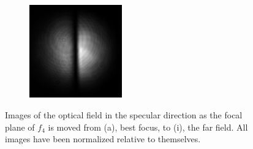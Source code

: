 \begin{figure}[ht]
  \begin{subfigure}[b]{4cm}
    \includegraphics[width=4cm,keepaspectratio]{interference/figures/move/123-1.png}
    \caption{}
  \end{subfigure}
  \caption{Images of the optical field in the specular direction as the focal
    plane of $f_4$ is moved from (a), best focus, to (i), the far field.  All
    images have been normalized relative to themselves.}
  \label{fig:123up}
\end{figure}

